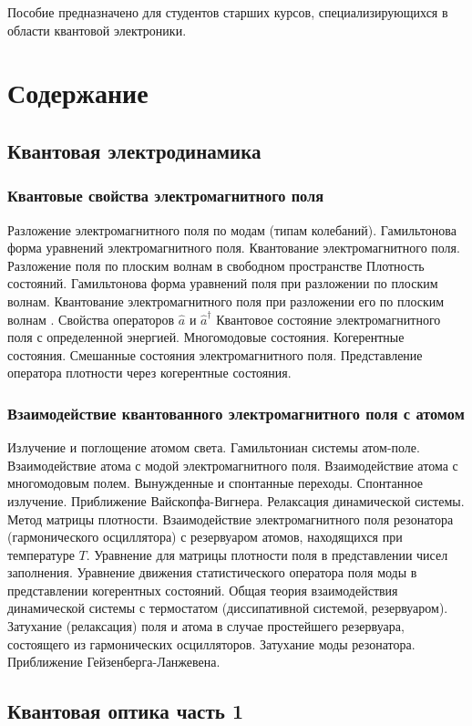 Пособие предназначено для студентов старших курсов, специализирующихся
в области квантовой электроники. 

\section{Содержание}
\subsection{Квантовая электродинамика}
\subsubsection{Квантовые свойства электромагнитного поля}
Разложение электромагнитного поля по модам (типам колебаний).
Гамильтонова форма уравнений электромагнитного поля.
Квантование электромагнитного поля.
Разложение поля по плоским волнам в свободном пространстве 
Плотность состояний.
Гамильтонова форма уравнений поля при разложении по плоским
волнам.
Квантование электромагнитного поля при разложении его по
плоским волнам .
Свойства операторов $ \hat a $ и $ \hat a ^\dag $ 
Квантовое состояние электромагнитного поля  с определенной
  энергией.
Многомодовые состояния. 
Когерентные состояния.
Смешанные состояния электромагнитного поля.
Представление оператора плотности через когерентные
состояния.
\subsubsection{Взаимодействие квантованного электромагнитного поля с атомом}
Излучение и поглощение атомом света.
Гамильтониан системы атом-поле.
Взаимодействие атома с модой электромагнитного поля.
Взаимодействие атома с многомодовым полем. Вынужденные и
спонтанные переходы.
Спонтанное излучение. Приближение Вайскопфа-Вигнера.
Релаксация динамической системы. Метод матрицы плотности.
Взаимодействие электромагнитного поля резонатора
(гармонического осциллятора) с резервуаром атомов, находящихся при
температуре $T$.
Уравнение для матрицы плотности поля в представлении чисел
заполнения.
Уравнение движения статистического оператора поля моды в
представлении когерентных состояний.
Общая теория взаимодействия динамической системы с
термостатом (диссипативной системой, резервуаром).
Затухание (релаксация) поля и атома в случае простейшего
резервуара, состоящего из гармонических осцилляторов.
Затухание моды резонатора. Приближение Гейзенберга-Ланжевена.

\subsection{Квантовая оптика часть 1}
